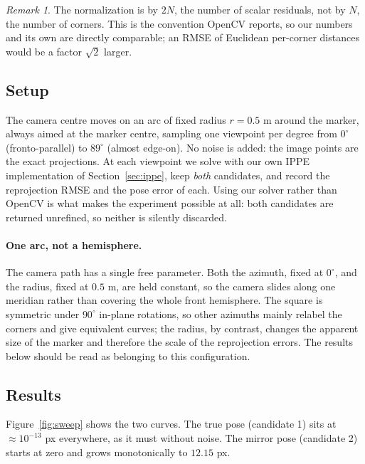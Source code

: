 \documentclass[11pt,a4paper]{article}
\theoremstyle{definition}
\theoremstyle{plain}
\theoremstyle{remark}
\newtheorem*{remark}{Remark}
\begin{document}
\begin{remark}
The normalization is by $2N$, the number of scalar residuals, not by $N$, the
number of corners. This is the convention OpenCV reports, so our numbers and
its own are directly comparable; an RMSE of Euclidean per-corner distances
would be a factor $\sqrt2$ larger.
\end{remark}

\subsection{Setup}

The camera centre moves on an arc of fixed radius $r = 0.5$ m around the
marker, always aimed at the marker centre, sampling one viewpoint per degree
from $0^\circ$ (fronto-parallel) to $89^\circ$ (almost edge-on). No noise is
added: the image points are the exact projections. At each viewpoint we solve
with our own IPPE implementation of Section~\ref{sec:ippe}, keep \emph{both}
candidates, and record the reprojection RMSE and the pose error of each. Using
our solver rather than OpenCV is what makes the experiment possible at all:
both candidates are returned unrefined, so neither is silently discarded.

\paragraph{One arc, not a hemisphere.} The camera path has a single free
parameter. Both the azimuth, fixed at $0^\circ$, and the radius, fixed at
$0.5$ m, are held constant, so the camera slides along one meridian rather than
covering the whole front hemisphere. The square is symmetric under
$90^\circ$ in-plane rotations, so other azimuths mainly relabel the corners and
give equivalent curves; the radius, by contrast, changes the apparent size of
the marker and therefore the scale of the reprojection errors. The results
below should be read as belonging to this configuration.

\subsection{Results}

Figure~\ref{fig:sweep} shows the two curves. The true pose (candidate 1) sits
at $\approx 10^{-13}$ px everywhere, as it must without noise. The mirror pose
(candidate 2) starts at zero and grows monotonically to $12.15$ px.
\end{document}
